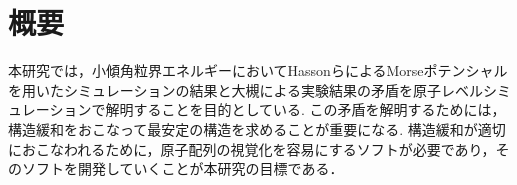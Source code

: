 \section{概要}
本研究では，小傾角粒界エネルギーにおいてHassonらによるMorseポテンシャルを用いたシミュレーションの結果と大槻による実験結果の矛盾を原子レベルシミュレーションで解明することを目的としている.
この矛盾を解明するためには，構造緩和をおこなって最安定の構造を求めることが重要になる.
構造緩和が適切におこなわれるために，原子配列の視覚化を容易にするソフトが必要であり，そのソフトを開発していくことが本研究の目標である．

